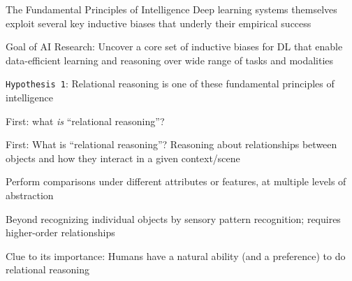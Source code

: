 \documentclass[xcolor={dvipsnames}]{beamer}
\begin{document}
\begin{frame}{The Fundamental Principles of Intelligence}
    Deep learning systems themselves exploit several key inductive biases that underly their empirical success

    \alert{Goal of AI Research:} Uncover a core set of inductive biases for DL that enable data-efficient learning and reasoning over wide range of tasks and modalities

    \alert{\texttt{Hypothesis 1}:} Relational reasoning is one of these fundamental principles of intelligence
\end{frame}

\begin{frame}[standout]
    First: what \emph{is} ``relational reasoning''?
\end{frame}

\begin{frame}{First: What is ``relational reasoning''?}
    Reasoning about \alert{relationships} between objects and how they interact in a given context/scene

    Perform \alert{comparisons} under different attributes or features, at multiple levels of abstraction

    Beyond recognizing individual objects by sensory pattern recognition; requires \alert{higher-order} relationships

    \alert{Clue to its importance:} Humans have a natural ability (and a preference) to do relational reasoning
\end{frame}
\end{document}
